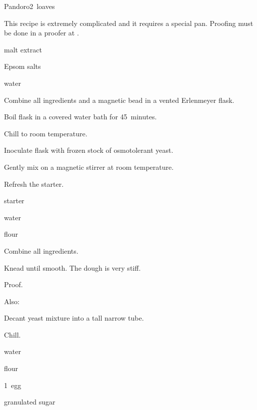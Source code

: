 \begin{recipe}{Pandoro}{}{2~loaves}

This recipe is extremely complicated and it requires a special pan. Proofing must be done in a proofer at .

\begin{ingredients}
\item {} malt extract
\item {} Epsom salts
\item {} water
\end{ingredients}

\begin{directions}
\item Combine all ingredients and a magnetic bead in a vented  Erlenmeyer flask.
\item Boil flask in a covered water bath for 45~minutes.
\item Chill to room temperature.
\item Inoculate flask with frozen stock of osmotolerant yeast.
\item Gently mix on a magnetic stirrer at room temperature.
\end{directions}

Refresh the starter.

\begin{ingredients}
\item {} starter
\item {} water
\item {} flour
\end{ingredients}

\begin{directions}
\item Combine all ingredients.
\item Knead until smooth. The dough is very stiff.
\item Proof.
\end{directions}

Also:

\begin{directions}
\item Decant yeast mixture into a tall narrow tube.
\item Chill.
\end{directions}

\begin{ingredients}
\item {} water
\item {} flour
\item 1~egg
\item {} granulated sugar
\end{ingredients}


\end{recipe}
